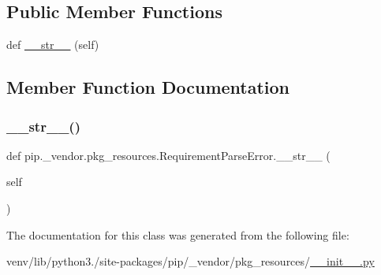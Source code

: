 \subsection*{Public Member Functions}
\begin{DoxyCompactItemize}
\item 
def \hyperlink{classpip_1_1__vendor_1_1pkg__resources_1_1RequirementParseError_a686c9165c2a577081df6c4241915f98f}{\+\_\+\+\_\+str\+\_\+\+\_\+} (self)
\end{DoxyCompactItemize}


\subsection{Member Function Documentation}
\mbox{\label{classpip_1_1__vendor_1_1pkg__resources_1_1RequirementParseError_a686c9165c2a577081df6c4241915f98f}} 
\subsubsection{\texorpdfstring{\+\_\+\+\_\+str\+\_\+\+\_\+()}{\_\_str\_\_()}}
{\footnotesize\ttfamily def pip.\+\_\+vendor.\+pkg\+\_\+resources.\+Requirement\+Parse\+Error.\+\_\+\+\_\+str\+\_\+\+\_\+ (\begin{DoxyParamCaption}\item[{}]{self }\end{DoxyParamCaption})}



The documentation for this class was generated from the following file\+:\begin{DoxyCompactItemize}
\item 
venv/lib/python3./site-\/packages/pip/\+\_\+vendor/pkg\+\_\+resources/\hyperlink{venv_2lib_2python3_89_2site-packages_2pip_2__vendor_2pkg__resources_2____init_____8py}{\+\_\+\+\_\+init\+\_\+\+\_\+.\+py}\end{DoxyCompactItemize}
